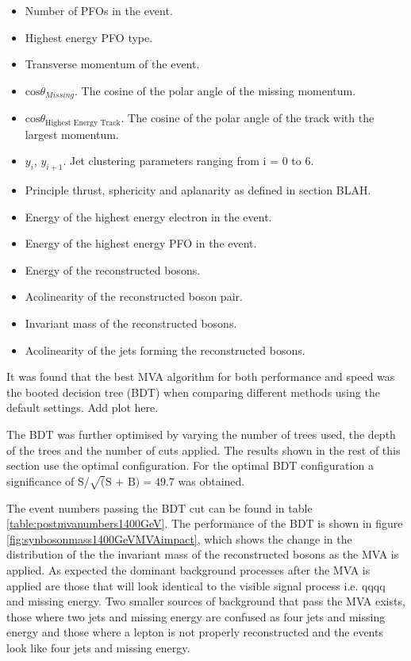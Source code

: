 \begin{itemize}
\item Number of PFOs in the event.
\item Highest energy PFO type.
\item Transverse momentum of the event.
\item $\text{cos}\theta_{Missing}$.  The cosine of the polar angle of the missing momentum.
\item $\text{cos}\theta_{\text{Highest Energy Track}}$.  The cosine of the polar angle of the track with the largest momentum.
\item $y_{i}$, $y_{i+1}$. Jet clustering parameters ranging from i = 0 to 6.
\item Principle thrust, sphericity and aplanarity as defined in section BLAH.
\item Energy of the highest energy electron in the event.
\item Energy of the highest energy PFO in the event.
\item Energy of the reconstructed bosons.
\item Acolinearity of the reconstructed boson pair.
\item Invariant mass of the reconstructed bosons.
\item Acolinearity of the jets forming the reconstructed bosons. 
\end{itemize}

It was found that the best MVA algorithm for both performance and speed was the booted decision tree (BDT) when comparing different methods using the default settings.  Add plot here.

The BDT was further optimised by varying the number of trees used, the depth of the trees and the number of cuts applied.  The results shown in the rest of this section use the optimal configuration.  For the optimal BDT configuration a significance of S/$\sqrt(\text{S + B}) = 49.7$ was obtained.  

The event numbers passing the BDT cut can be found in table \ref{table:postmvanumbers1400GeV}.  The performance of the BDT is shown in figure \ref{fig:synbosonmass1400GeVMVAimpact}, which shows the change in the distribution of the the invariant mass of the reconstructed bosons as the MVA is applied. As expected the dominant background processes after the MVA is applied are those that will look identical to the visible signal process i.e. qqqq and missing energy.  Two smaller sources of background that pass the MVA exists, those where two jets and missing energy are confused as four jets and missing energy and those where a lepton is not properly reconstructed and the events look like four jets and missing energy.  

